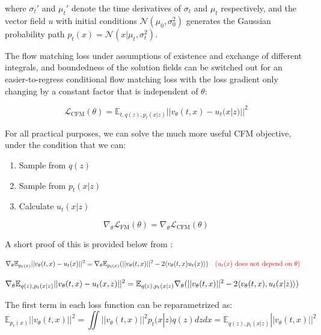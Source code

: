 \documentclass[12pt]{article}
\renewcommand{\[}{\left[}
\renewcommand{\]}{\right]}
\renewcommand{\(}{\left(}
\renewcommand{\)}{\right)}
\newcommand{\grad}[1]{\nabla #1}
\newcommand{\EE}{\mathbb{E}}
\newcommand{\CL}{\mathcal{L}}
\newcommand{\CN}{\mathcal{N}}
\begin{document}
where $\sigma_t'$ and $\mu_t'$ denote the time derivatives of $\sigma_t$ and $\mu_t$ respectively, and the vector field $u$ with initial conditions $\CN(\mu_0, \sigma_0^2)$ generates the Gaussian probability path $p_t(x) = \CN(x | \mu_t, \sigma_t^2)$.

The flow matching loss under assumptions of existence and exchange of different integrals, and boundedness of the solution fields can be switched out for an easier-to-regress conditional flow matching loss with the loss gradient only changing by a constant factor that is independent of $\theta$:

\begin{equation}
    \CL_{\text{CFM}}(\theta) = \EE_{t, q(z), p_t(x|z)}||v_\theta(t, x) - u_t(x|z)||^2 \label{eq: cfm_loss}
\end{equation}

For all practical purposes, we can solve the much more useful CFM objective, under the condition that we can:

\begin{enumerate}
    \item Sample from $q(z)$

    \item Sample from $p_t(x|z)$

    \item Calculate $u_t(x|z)$
\end{enumerate}

\begin{equation}
    \nabla_{\theta}\CL_{\text{FM}}(\theta) =\nabla_{\theta}\CL_{\text{CFM}}(\theta) \label{eq: cfm_fm_grad}
\end{equation}

A short proof of this is provided below from \cite{tong_improving_2024}:

\begin{align*}
    \grad_{\theta}\EE_{p_t(x)}||v_\theta(t, x) - u_t(x)||^2 &= \grad_\theta \EE_{p_t(x)}(||v_\theta(t, x)||^2 - 2\langle v_\theta(t, x) u_t(x)\rangle) \quad \textcolor{red}{\text{($u_t(x)
    $ does not depend on $\theta$})}
\end{align*}


\begin{align*}
    \grad_{\theta}\EE_{q(z),p_t(x|z)}||v_\theta(t, x) - u_t(x, z)||^2 &= \EE_{q(z), p_t(x|z)}\grad_{\theta}(||v_\theta(t, x)||^2 - 2 \langle v_\theta(t, x) , u_t(x|z)\rangle)
\end{align*}

The first term in each loss function can be reparametrized as:
\begin{equation*}
    \EE_{p_t(x)}||v_\theta(t, x)||^2 = \iint ||v_\theta(t, x)||^2 p_t(x|z)q(z)dz dx = \EE_{q(z), p_t(x|z)}||v_\theta(t, x)||^2
\end{equation*}
\end{document}
